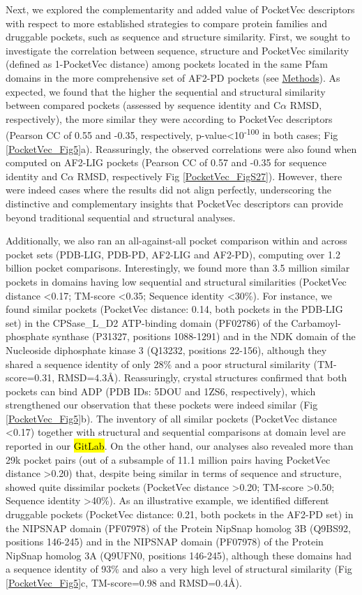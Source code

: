 Next, we explored the complementarity and added value of PocketVec descriptors with respect to more established strategies to compare protein families and druggable pockets, such as sequence and structure similarity. First, we sought to investigate the correlation between sequence, structure and PocketVec similarity (defined as 1-PocketVec distance) among pockets located in the same Pfam domains in the more comprehensive set of AF2-PD pockets (see \hyperref[PocketVec_Methods]{Methods}). As expected, we found that the higher the sequential and structural similarity between compared pockets (assessed by sequence identity and C$\alpha$ RMSD, respectively), the more similar they were according to PocketVec descriptors (Pearson CC of 0.55 and -0.35, respectively, p-value<10\textsuperscript{-100} in both cases; Fig \ref{PocketVec_Fig5}a). Reassuringly, the observed correlations were also found when computed on AF2-LIG pockets (Pearson CC of 0.57 and -0.35 for sequence identity and C$\alpha$ RMSD, respectively Fig \ref{PocketVec_FigS27}). However, there were indeed cases where the results did not align perfectly, underscoring the distinctive and complementary insights that PocketVec descriptors can provide beyond traditional sequential and structural analyses.

Additionally, we also ran an all-against-all pocket comparison within and across pocket sets (PDB-LIG, PDB-PD, AF2-LIG and AF2-PD), computing over 1.2 billion pocket comparisons. Interestingly, we found more than 3.5 million similar pockets in domains having low sequential and structural similarities (PocketVec distance <0.17; TM-score <0.35; Sequence identity <30\%). For instance, we found similar pockets (PocketVec distance: 0.14, both pockets in the PDB-LIG set) in the CPSase\_L\_D2 ATP-binding domain (PF02786) of the Carbamoyl-phosphate synthase (P31327, positions 1088-1291) and in the NDK domain of the Nucleoside diphosphate kinase 3 (Q13232, positions 22-156), although they shared a sequence identity of only 28\% and a poor structural similarity (TM-score=0.31, RMSD=4.3Å). Reassuringly, crystal structures confirmed that both pockets can bind ADP (PDB IDs: 5DOU and 1ZS6, respectively), which strengthened our observation that these pockets were indeed similar (Fig \ref{PocketVec_Fig5}b). The inventory of all similar pockets (PocketVec distance <0.17) together with structural and sequential comparisons at domain level are reported in our \hl{GitLab}. On the other hand, our analyses also revealed more than 29k pocket pairs (out of a subsample of 11.1 million pairs having PocketVec distance >0.20) that, despite being similar in terms of sequence and structure, showed quite dissimilar pockets (PocketVec distance >0.20; TM-score >0.50; Sequence identity >40\%). As an illustrative example, we identified different druggable pockets (PocketVec distance: 0.21, both pockets in the AF2-PD set) in the NIPSNAP domain (PF07978) of the Protein NipSnap homolog 3B (Q9BS92, positions 146-245) and in the NIPSNAP domain (PF07978) of the Protein NipSnap homolog 3A (Q9UFN0, positions 146-245), although these domains had a sequence identity of 93\% and also a very high level of structural similarity (Fig \ref{PocketVec_Fig5}c, TM-score=0.98 and RMSD=0.4Å).

